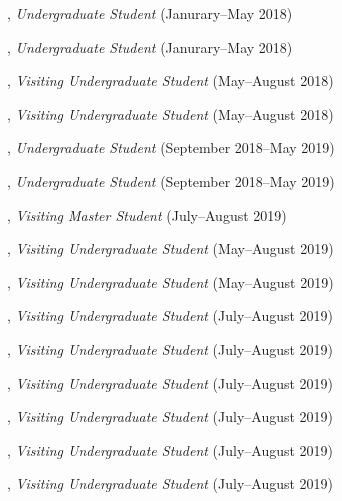 \documentclass[10pt]{article}
\newenvironment{myindentpar}[1]%
{\begin{list}{}%
         {\setlength{\leftmargin}{#1}}%
         \item[]%
}
{\end{list}}
\newcounter{list}
\begin{document}
\begin{myindentpar}{0.75cm}

\hspace{-0.75cm}{\bf Matthew Malir}, \emph{Undergraduate Student} (Janurary--May 2018)
	
\hspace{-0.75cm}{\bf Sebastian Miner}, \emph{Undergraduate Student} (Janurary--May 2018)

\hspace{-0.75cm}{\bf Wenhao Yu}, \emph{Visiting Undergraduate Student} (May--August 2018)

\hspace{-0.75cm}{\bf Yu Shu}, \emph{Visiting Undergraduate Student} (May--August 2018)

\hspace{-0.75cm}{\bf Matthew Schoenbauer}, \emph{Undergraduate Student} (September 2018--May 2019)
	
\hspace{-0.75cm}{\bf Tina Wu}, \emph{Undergraduate Student} (September 2018--May 2019)
	
\hspace{-0.75cm}{\bf Zijian Hu}, \emph{Visiting Master Student} (July--August 2019)

\hspace{-0.75cm}{\bf Yihong Ma}, \emph{Visiting Undergraduate Student} (May--August 2019)

\hspace{-0.75cm}{\bf Chuchen Deng}, \emph{Visiting Undergraduate Student} (May--August 2019)

\hspace{-0.75cm}{\bf Zhihan Zhang}, \emph{Visiting Undergraduate Student} (July--August 2019)

\hspace{-0.75cm}{\bf Xin Liu}, \emph{Visiting Undergraduate Student} (July--August 2019)

\hspace{-0.75cm}{\bf Mengxia Yu}, \emph{Visiting Undergraduate Student} (July--August 2019)

\hspace{-0.75cm}{\bf Wei Peng}, \emph{Visiting Undergraduate Student} (July--August 2019)

\hspace{-0.75cm}{\bf Kaifeng Yu}, \emph{Visiting Undergraduate Student} (July--August 2019)

\hspace{-0.75cm}{\bf Yang Zhou}, \emph{Visiting Undergraduate Student} (July--August 2019)

\end{myindentpar}
\end{document}
